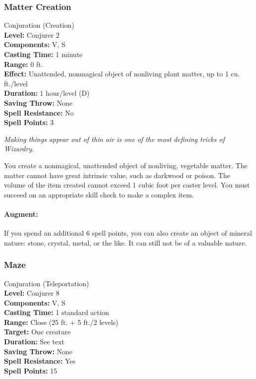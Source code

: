 \subsubsection{Matter Creation}
\label{Spell:MatterCreation}
Conjuration (Creation)
\\ \textbf{Level:} Conjurer 2
\\ \textbf{Components:} V, S
\\ \textbf{Casting Time:} 1 minute
\\ \textbf{Range:} 0 ft.
\\ \textbf{Effect:} Unattended, nonmagical object of nonliving plant matter, up to 1 cu. ft./level
\\ \textbf{Duration:} 1 hour/level (D)
\\ \textbf{Saving Throw:} None
\\ \textbf{Spell Resistance:} No
\\ \textbf{Spell Points:} 3

\emph{Making things appear out of thin air is one of the most defining tricks of Wizardry.}

You create a nonmagical, unattended object of nonliving, vegetable matter.
The matter cannot have great intrinsic value, such as darkwood or poison.
The volume of the item created cannot exceed 1 cubic foot per caster level. 
You must succeed on an appropriate skill check to make a complex item.


\paragraph{Augment:} If you spend an additional 6 spell points, you can also create an object of mineral nature: stone, crystal, metal, or the like.
It can still not be of a valuable nature.
\subsubsection{Maze}
\label{Spell:Maze}
Conjuration (Teleportation)
\\ \textbf{Level:} Conjurer 8
\\ \textbf{Components:} V, S
\\ \textbf{Casting Time:} 1 standard action
\\ \textbf{Range:} Close (25 ft. + 5 ft./2 levels)
\\ \textbf{Target:} One creature
\\ \textbf{Duration:} See text
\\ \textbf{Saving Throw:} None
\\ \textbf{Spell Resistance:} Yes
\\ \textbf{Spell Points:} 15

